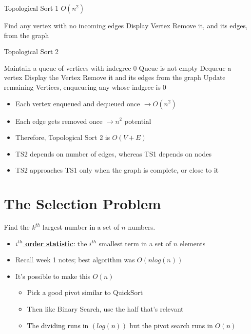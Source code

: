 \documentclass[12pt]{article}
\newcommand{\definition}[1]{\underline{\textbf{#1}}}
\begin{document}
\pagebreak

\begin{algorithm}
    \caption{Topological Sort 1 $O(n^2)$}
    \begin{algorithmic}
            \State Find any vertex with no incoming edges
            \State Display Vertex
            \State Remove it, and its edges, from the graph
        \EndWhile
    \end{algorithmic}
\end{algorithm}

\begin{algorithm}
    \caption{Topological Sort 2}
    \begin{algorithmic}
        \State Maintain a queue of vertices with indegree $0$
        \While Queue is not empty
            \State Dequeue a vertex
            \State Display the Vertex
            \State Remove it and its edges from the graph
            \State Update remaining Vertices, enqueueing any whose indgree is $0$
        \EndWhile
    \end{algorithmic}
\end{algorithm}

\begin{itemize}
    \item Each vertex enqueued and dequeued once $\rightarrow O(n^2)$
    \item Each edge gets removed once $\rightarrow n^2$ potential
    \item Therefore, Topological Sort 2 is $O(V+E)$
    \item TS2 depends on number of edges, whereas TS1 depends on nodes
    \item TS2 approaches TS1 only when the graph is complete, or close to it
\end{itemize}

\section*{The Selection Problem}

Find the $k^{th}$ largest number in a set of $n$ numbers.

\begin{itemize}

    \item \definition{$i^{th}$ order statistic}: the $i^{th}$ smallest term in a set of $n$ elements
    \item Recall week 1 notes; best algorithm was $O(nlog(n))$
    \item It's possible to make this $O(n)$
    \begin{itemize}
        \item Pick a good pivot similar to QuickSort
        \item Then like Binary Search, use the half that's relevant
        \item The dividing runs in $(log(n))$ but the pivot search runs in $O(n)$
    \end{itemize}

\end{itemize}
\end{document}
